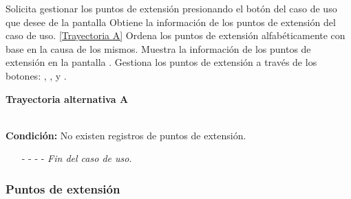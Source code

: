 \begin{UCtrayectoria}
	\UCpaso[\UCactor] Solicita gestionar los puntos de extensión presionando el botón  del caso de uso que desee de la pantalla 
	\UCpaso[\UCsist] Obtiene la información de los puntos de extensión del caso de uso. \hyperlink{CU12-1-6:TAA}{[Trayectoria A]}
	\UCpaso[\UCsist] Ordena los puntos de extensión alfabéticamente con base en la causa de los mismos.
	\UCpaso[\UCsist] Muestra la información de los puntos de extensión en la pantalla . \label{CU12.1.6-P4}
	\UCpaso[\UCactor] Gestiona los puntos de extensión a través de los botones: , \editar, y \eliminar.
\end{UCtrayectoria}		
\hypertarget{CU12-1-6:TAA}{\textbf{Trayectoria alternativa A}}\\
\noindent \textbf{Condición:} No existen registros de puntos de extensión.
\begin{enumerate}
	\UCpaso[\UCsist] Muestra el mensaje  en la pantalla  para indicar que no hay registros de puntos de extensión para mostrar. \label{CU12.1.6-TA1}
	\UCpaso[\UCactor] Gestiona los casos de uso a través del botón: . 
	\item[- -] - - {\em {Fin del caso de uso}}.%
\end{enumerate}

\subsubsection{Puntos de extensión}


